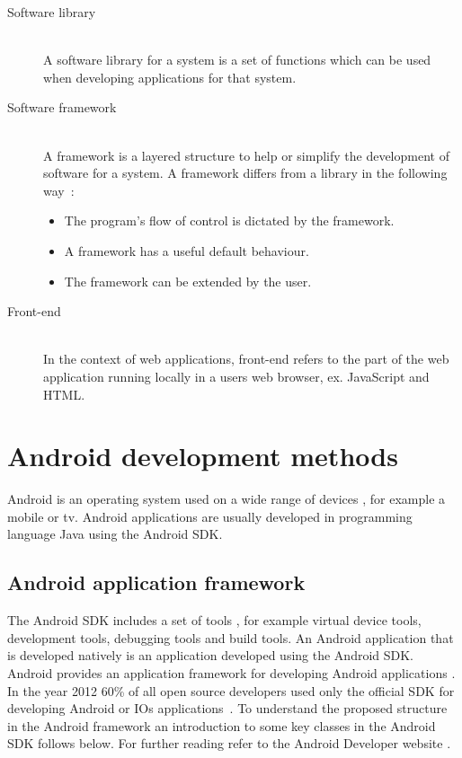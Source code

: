 \begin{description}
\item[Software library] \hfill \\
	A software library for a system is a set of functions which can be used when developing applications for that system.
\item[Software framework] \hfill \\
	A framework is a layered structure to help or simplify the development of software for a system. A framework differs from a library in the following way~\cite{riehle2000}:
\begin{itemize}
\item The program's flow of control is dictated by the framework.
\item A framework has a useful default behaviour.
\item The framework can be extended by the user.
\end{itemize}
\item[Front-end] \hfill \\
	In the context of web applications, front-end refers to the part of the web application running locally in a users web browser, ex. JavaScript and HTML. 
\end{description}

\section{Android development methods}\label{sec:android-development-methods}
Android is an operating system used on a wide range of devices \cite{dell2011}, for example a mobile or tv. Android applications are usually developed in programming language Java using the Android SDK.

\subsection{Android application framework} \label{subsec:android-application-framework}
The Android SDK includes a set of tools \cite{sdk2015}, for example virtual device tools, development tools, debugging tools and build tools. An Android application that is developed natively is an application developed using the Android SDK. Android provides an application framework for developing Android applications \cite{android-framework2015}. In the year 2012 60\% of all open source developers used only the official SDK for developing Android or IOs applications~\cite{eclipse2012}. To understand the proposed structure in the Android framework an introduction to some key classes in the Android SDK follows below. For further reading refer to the Android Developer website \cite{androiddevelopers2015}.

